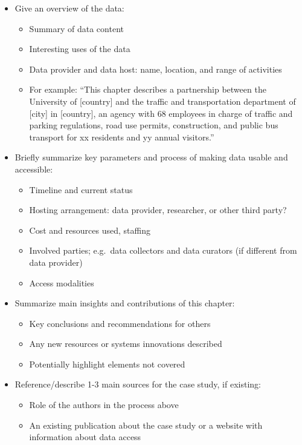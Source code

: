\documentclass[
]{book}
\providecommand{\tightlist}{%
  \setlength{\itemsep}{0pt}\setlength{\parskip}{0pt}}
\begin{document}
\begin{itemize}
\tightlist
\item
  Give an overview of the data:

  \begin{itemize}
  \tightlist
  \item
    Summary of data content
  \item
    Interesting uses of the data
  \item
    Data provider and data host: name, location, and range of activities
  \item
    For example: ``This chapter describes a partnership between the University of {[}country{]} and the traffic and transportation department of {[}city{]} in {[}country{]}, an agency with 68 employees in charge of traffic and parking regulations, road use permits, construction, and public bus transport for xx residents and yy annual visitors.''
  \end{itemize}
\item
  Briefly summarize key parameters and process of making data usable and accessible:

  \begin{itemize}
  \tightlist
  \item
    Timeline and current status
  \item
    Hosting arrangement: data provider, researcher, or other third party?
  \item
    Cost and resources used, staffing
  \item
    Involved parties; e.g.~data collectors and data curators (if different from data provider)
  \item
    Access modalities
  \end{itemize}
\item
  Summarize main insights and contributions of this chapter:

  \begin{itemize}
  \tightlist
  \item
    Key conclusions and recommendations for others
  \item
    Any new resources or systems innovations described
  \item
    Potentially highlight elements not covered
  \end{itemize}
\item
  Reference/describe 1-3 main sources for the case study, if existing:

  \begin{itemize}
  \tightlist
  \item
    Role of the authors in the process above\\
  \item
    An existing publication about the case study or a website with information about data access
  \end{itemize}
\end{itemize}
\end{document}
